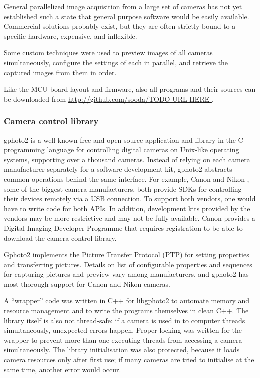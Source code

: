 General parallelized image acquisition from a large set of cameras has not yet established such a state that general purpose software would be easily available.
Commercial solutions probably exist, but they are often strictly bound to a specific hardware, expensive, and inflexible.

Some custom techniques were used to preview images of all cameras simultaneously, configure the settings of each in parallel, and retrieve the captured images from them in order.

Like the MCU board layout and firmware, also all programs and their sources can be downloaded from \url { http://github.com/sooda/TODO-URL-HERE }.


\subsubsection{Camera control library} %

gphoto2 \cite{gphoto2} is a well-known free and open-source application and library in the C programming language for controlling digital cameras on Unix-like operating systems, supporting over a thousand cameras.
Instead of relying on each camera manufacturer separately for a software development kit, gphoto2 abstracts common operations behind the same interface.
For example, Canon \cite{canonsdk} and Nikon \cite{nikonsdk}, some of the biggest camera manufacturers, both provide SDKs for controlling their devices remotely via a USB connection.
To support both vendors, one would have to write code for both APIs.
In addition, development kits provided by the vendors may be more restrictive and may not be fully available.
Canon provides a Digital Imaging Developer Programme that requires registration to be able to download the camera control library.

Gphoto2 implements the Picture Transfer Protocol (PTP) \cite{ptpTODO} for setting properties and transferring pictures.
Details on list of configurable properties and sequences for capturing pictures and preview vary among manufacturers, and gphoto2 has most thorough support for Canon and Nikon cameras.

A ``wrapper'' code was written in C++ for libgphoto2 to automate memory and resource management and to write the programs themselves in clean C++.
The library itself is also not thread-safe: if a camera is used in to computer threads simultaneously, unexpected errors happen.
Proper locking was written for the wrapper to prevent more than one executing threads from accessing a camera simultaneously.
The library initialisation was also protected, because it loads camera resources only after first use; if many cameras are tried to initialise at the same time, another error would occur.


